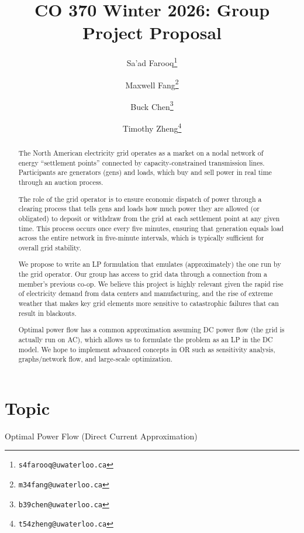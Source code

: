 \documentclass[11pt]{article}
\title{CO 370 Winter 2026: Group Project Proposal}
\author{
Sa'ad Farooq\thanks{\texttt{s4farooq@uwaterloo.ca}} \and
Maxwell Fang\thanks{\texttt{m34fang@uwaterloo.ca}} \and
Buck Chen\thanks{\texttt{b39chen@uwaterloo.ca}} \and
Timothy Zheng\thanks{\texttt{t54zheng@uwaterloo.ca}}
}
\date{}
\begin{document}
\maketitle

\section*{Topic}
Optimal Power Flow (Direct Current Approximation)

\begin{abstract}
The North American electricity grid operates as a market on a nodal network of energy ``settlement points'' connected by capacity-constrained transmission lines. Participants are generators (gens) and loads, which buy and sell power in real time through an auction process.

The role of the grid operator is to ensure economic dispatch of power through a clearing process that tells gens and loads how much power they are allowed (or obligated) to deposit or withdraw from the grid at each settlement point at any given time. This process occurs once every five minutes, ensuring that generation equals load across the entire network in five-minute intervals, which is typically sufficient for overall grid stability.

We propose to write an LP formulation that emulates (approximately) the one run by the grid operator. Our group has access to grid data through a connection from a member's previous co-op. We believe this project is highly relevant given the rapid rise of electricity demand from data centers and manufacturing, and the rise of extreme weather that makes key grid elements more sensitive to catastrophic failures that can result in blackouts.

Optimal power flow has a common approximation assuming DC power flow (the grid is actually run on AC), which allows us to formulate the problem as an LP in the DC model. We hope to implement advanced concepts in OR such as sensitivity analysis, graphs/network flow, and large-scale optimization.
\end{abstract}
\end{document}

